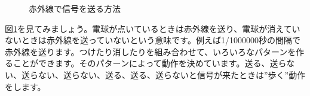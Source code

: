 \begin{figure}[H]
\centering

\caption{赤外線で信号を送る方法}
\label{ir}
\end{figure}

図\ref{ir}を見てみましょう。電球が点いているときは赤外線を送り、電球が消えていないときは赤外線を送っていないという意味です。例えば1/1000000秒の間隔で赤外線を送ります。つけたり消したりを組み合わせて、いろいろなパターンを作ることができます。そのパターンによって動作を決めています。送る、送らない、送らない、送らない、送る、送る、送らないと信号が来たときは”歩く”動作をします。
